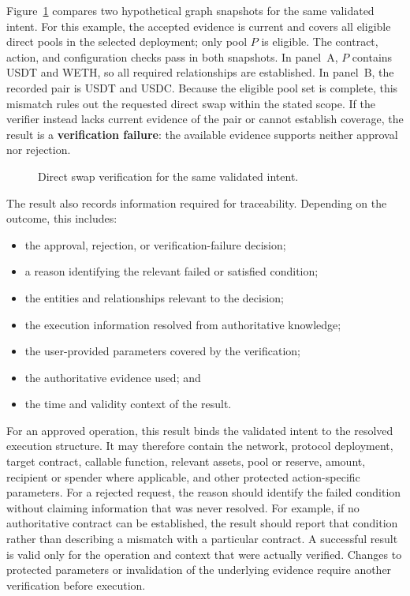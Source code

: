Figure~\ref{fig:verification_outcome_examples} compares two hypothetical
graph snapshots for the same validated intent. For this example, the
accepted evidence is current and covers all eligible direct pools in the
selected deployment; only pool $P$ is eligible. The contract, action, and
configuration checks pass in both snapshots. In panel~A, $P$ contains USDT
and WETH, so all required relationships are established. In panel~B, the
recorded pair is USDT and USDC. Because the eligible pool set is complete,
this mismatch rules out the requested direct swap within the stated scope.
If the verifier instead lacks current evidence of the pair or cannot
establish coverage, the result is a \textbf{verification failure}: the
available evidence supports neither approval nor rejection.

\begin{figure}[H]
    \centering
    \resizebox{0.98\linewidth}{!}{%
    }
    \caption{Direct swap verification for the same validated intent.}
    \label{fig:verification_outcome_examples}
\end{figure}

The result also records information required for traceability. Depending on the
outcome, this includes:

\begin{itemize}
    \item the approval, rejection, or verification-failure decision;
    \item a reason identifying the relevant failed or satisfied condition;
    \item the entities and relationships relevant to the decision;
    \item the execution information resolved from authoritative knowledge;
    \item the user-provided parameters covered by the verification;
    \item the authoritative evidence used; and
    \item the time and validity context of the result.
\end{itemize}

For an approved operation, this result binds the validated intent to the
resolved execution structure. It may therefore contain the network, protocol
deployment, target contract, callable function, relevant assets, pool or
reserve, amount, recipient or spender where applicable, and other protected
action-specific parameters. For a rejected request, the reason should identify the failed condition without
claiming information that was never resolved. For example, if no authoritative
contract can be established, the result should report that condition rather
than describing a mismatch with a particular contract. A successful result is valid only for the operation and context that were
actually verified. Changes to protected parameters or invalidation of the
underlying evidence require another verification before execution.

